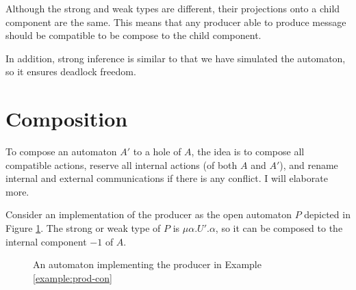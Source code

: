 Although the strong and weak types are different, their projections onto a child component are the same. This means that any producer able to produce message should be compatible to be compose to the child component.

In addition, strong inference is similar to that we have simulated the automaton, so it ensures deadlock freedom.


\section{Composition}

To compose an automaton $A'$ to a hole of $A$, the idea is to compose all compatible actions, reserve all internal actions (of both $A$ and $A'$), and rename internal and external communications if there is any conflict. I will elaborate more.

\begin{example}
  Consider an implementation of the producer as the open automaton $P$ depicted in Figure \ref{fig:prod}. The strong or weak type of $P$ is $\mu\alpha.U'.\alpha$, so it can be composed to the internal component $-1$ of $A$.
\end{example}

\begin{figure}
  \centering
  \caption{An automaton implementing the producer in Example \ref{example:prod-con}}
  \label{fig:prod}
\end{figure}


